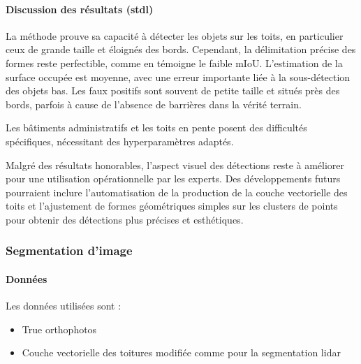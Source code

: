 \paragraph{Discussion des résultats (\acrshort{stdl})}
\par{La méthode prouve sa capacité à détecter les objets sur les toits, en particulier ceux de grande taille et éloignés des bords. Cependant, la délimitation précise des formes reste perfectible, comme en témoigne le faible mIoU. L'estimation de la surface occupée est moyenne, avec une erreur importante liée à la sous-détection des objets bas. Les faux positifs sont souvent de petite taille et situés près des bords, parfois à cause de l'absence de barrières dans la vérité terrain.}
\par{Les bâtiments administratifs et les toits en pente posent des difficultés spécifiques, nécessitant des hyperparamètres adaptés.}
\par{Malgré des résultats honorables, l'aspect visuel des détections reste à améliorer pour une utilisation opérationnelle par les experts. Des développements futurs pourraient inclure l'automatisation de la production de la couche vectorielle des toits et l'ajustement de formes géométriques simples sur les clusters de points pour obtenir des détections plus précises et esthétiques.}

\newpage
\subsubsection{Segmentation d'image}

\paragraph{Données}

\par{Les données utilisées sont :}
\begin{itemize}
    \item True orthophotos \cite{sitg_orthophotos_nodate}
    \item Couche vectorielle des toitures modifiée comme pour la segmentation \gls{lidar}
\end{itemize}


